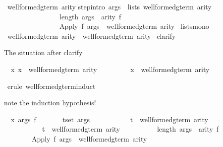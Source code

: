 \begin{isabellebody}
\ {\isachardoublequote}well{\isacharunderscore}formed{\isacharunderscore}gterm{\isacharprime}\ arity{\isachardoublequote}\isanewline
{}\isanewline
step{\isacharbrackleft}intro{\isacharbang}{\isacharbrackright}{\isacharcolon}\ {\isachardoublequote}{\isasymlbrakk}args\ {\isasymin}\ lists\ {\isacharparenleft}well{\isacharunderscore}formed{\isacharunderscore}gterm{\isacharprime}\ arity{\isacharparenright}{\isacharsemicolon}\ \ \isanewline
\ \ \ \ \ \ \ \ \ \ \ \ \ \ \ \ length\ args\ {\isacharequal}\ arity\ f{\isasymrbrakk}\isanewline
\ \ \ \ \ \ \ \ \ \ \ \ \ \ \ {\isasymLongrightarrow}\ {\isacharparenleft}Apply\ f\ args{\isacharparenright}\ {\isasymin}\ well{\isacharunderscore}formed{\isacharunderscore}gterm{\isacharprime}\ arity{\isachardoublequote}\isanewline
{}\ lists{\isacharunderscore}mono\isanewline
\isanewline
{}\ {\isachardoublequote}well{\isacharunderscore}formed{\isacharunderscore}gterm\ arity\ {\isasymsubseteq}\ well{\isacharunderscore}formed{\isacharunderscore}gterm{\isacharprime}\ arity{\isachardoublequote}\isanewline
{}\ clarify%
\begin{isamarkuptxt}%
The situation after clarify
\begin{isabelle}%
\ {}{\isachardot}\ {\isasymAnd}x{\isachardot}\ x\ {\isasymin}\ well{\isacharunderscore}formed{\isacharunderscore}gterm\ arity\ {\isasymLongrightarrow}\isanewline
\ \ \ \ \ \ \ \ x\ {\isasymin}\ well{\isacharunderscore}formed{\isacharunderscore}gterm{\isacharprime}\ arity%
\end{isabelle}%
\end{isamarkuptxt}%
\ {\isacharparenleft}erule\ well{\isacharunderscore}formed{\isacharunderscore}gterm{\isachardot}induct{\isacharparenright}%
\begin{isamarkuptxt}%
note the induction hypothesis!
\begin{isabelle}%
\ {}{\isachardot}\ {\isasymAnd}x\ args\ f{\isachardot}\isanewline
\ \ \ \ \ \ \ {\isasymlbrakk}{\isasymforall}t{\isasymin}set\ args{\isachardot}\isanewline
\ \ \ \ \ \ \ \ \ \ \ t\ {\isasymin}\ well{\isacharunderscore}formed{\isacharunderscore}gterm\ arity\ {\isasymand}\isanewline
\ \ \ \ \ \ \ \ \ \ \ t\ {\isasymin}\ well{\isacharunderscore}formed{\isacharunderscore}gterm{\isacharprime}\ arity{\isacharsemicolon}\isanewline
\ \ \ \ \ \ \ \ \ \ length\ args\ {\isacharequal}\ arity\ f{\isasymrbrakk}\isanewline
\ \ \ \ \ \ \ {\isasymLongrightarrow}\ Apply\ f\ args\ {\isasymin}\ well{\isacharunderscore}formed{\isacharunderscore}gterm{\isacharprime}\ arity%

\end{isabelle}
\end{isamarkuptxt}
\end{isabellebody}
